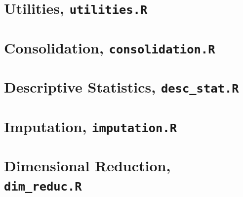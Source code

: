\documentclass[../thesis.tex]{subfiles}
\begin{document}
\section{Utilities, \texttt{utilities.R}}
\label{sec:helper_func}



\section{Consolidation, \texttt{consolidation.R}}
\label{sec:consolidation}



\section{Descriptive Statistics, \texttt{desc\_stat.R}}
\label{sec:app_desc_stat}



\section{Imputation, \texttt{imputation.R}}
\label{sec:app_impu}



\section{Dimensional Reduction, \texttt{dim\_reduc.R}}
\label{sec:dim_red}
\end{document}
